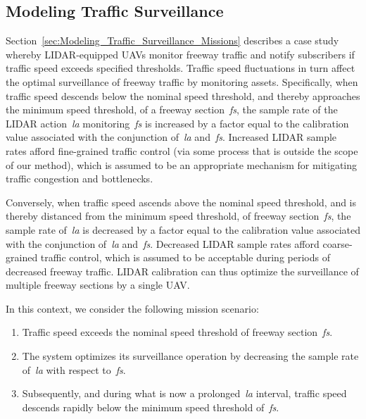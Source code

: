 \subsection{Modeling Traffic Surveillance}
\label{sec:Modeling_Traffic_Surveillance}

Section~\ref{sec:Modeling_Traffic_Surveillance_Missions} describes a case study whereby LIDAR-equipped UAVs monitor freeway traffic and notify subscribers if traffic speed exceeds specified thresholds. Traffic speed fluctuations in turn affect the optimal surveillance of freeway traffic by monitoring assets. Specifically, when traffic speed descends below the nominal speed threshold, and thereby approaches the minimum speed threshold, of a freeway section~\emph{fs}, the sample rate of the LIDAR action~\emph{la} monitoring~\emph{fs} is increased by a factor equal to the calibration value associated with the conjunction of~\emph{la} and~\emph{fs}. Increased LIDAR sample rates afford fine-grained traffic control (via some process that is outside the scope of our method), which is assumed to be an appropriate mechanism for mitigating traffic congestion and bottlenecks.

Conversely, when traffic speed ascends above the nominal speed threshold, and is thereby distanced from the minimum speed threshold, of freeway section~\emph{fs}, the sample rate of~\emph{la} is decreased by a factor equal to the calibration value associated with the conjunction of~\emph{la} and~\emph{fs}. Decreased LIDAR sample rates afford coarse-grained traffic control, which is assumed to be acceptable during periods of decreased freeway traffic. LIDAR calibration can thus optimize the surveillance of multiple freeway sections by a single UAV\@.

In this context, we consider the following mission scenario:

\begin{enumerate}

\item Traffic speed exceeds the nominal speed threshold of freeway section~\emph{fs}.

\item The system optimizes its surveillance operation by decreasing the sample rate of~\emph{la} with respect to~\emph{fs}.

\item Subsequently, and during what is now a prolonged~\emph{la} interval, traffic speed descends rapidly below the minimum speed threshold of~\emph{fs}.

\end{enumerate}

